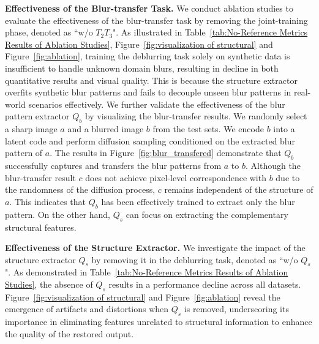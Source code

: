 \textbf{Effectiveness of the Blur-transfer Task.} We conduct ablation studies to evaluate the effectiveness of the blur-transfer task by removing the joint-training phase, denoted as ``w/o $T_{2}T_{3}$". As illustrated in Table~\ref{tab:No-Reference Metrics Results of Ablation Studies}, Figure~\ref{fig:visualization of structural} and Figure~\ref{fig:ablation}, training the deblurring task solely on synthetic data is insufficient to handle unknown domain blurs, resulting in decline in both quantitative results and visual quality. This is because the structure extractor overfits synthetic blur patterns and fails to decouple unseen blur patterns in real-world scenarios effectively. We further validate the effectiveness of the blur pattern extractor $Q_b$ by visualizing the blur-transfer results. We randomly select a sharp image $a$ and a blurred image $b$ from the test sets. We encode $b$ into a latent code and perform diffusion sampling conditioned on the extracted blur pattern of $a$. The results in Figure~\ref{fig:blur_transfered} demonstrate that $Q_b$ successfully captures and transfers the blur patterns from $a$ to $b$. Although the blur-transfer result $c$ does not achieve pixel-level correspondence with $b$ due to the randomness of the diffusion process, $c$ remains independent of the structure of $a$. This indicates that $Q_b$ has been effectively trained to extract only the blur pattern. On the other hand, $Q_s$ can focus on extracting the complementary structural features.


\textbf{Effectiveness of the Structure Extractor.} We investigate the impact of the structure extractor $Q_s$ by removing it in the deblurring task, denoted as ``w/o $Q_s$". As demonstrated in Table~\ref{tab:No-Reference Metrics Results of Ablation Studies}, the absence of $Q_s$ results in a performance decline across all datasets. Figure~\ref{fig:visualization of structural} and  Figure~\ref{fig:ablation} reveal the emergence of artifacts and distortions when $Q_s$ is removed, underscoring its importance in eliminating features unrelated to structural information to enhance the quality of the restored output. 


